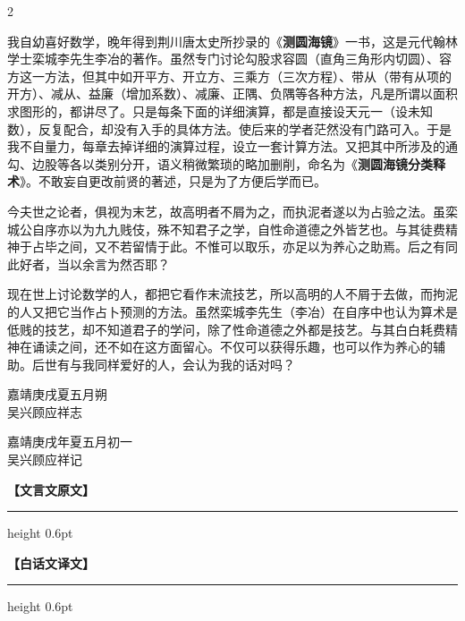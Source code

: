 \documentclass[11pt,a4paper]{article}
\newcommand{\colheaders}{%
  \noindent\begin{minipage}[t]{0.48\textwidth}\centering
    \textbf{\color{classicalframe}【文言文原文】}
    \vspace{0.3em}
    \hrule height 0.6pt
  \end{minipage}%
  \hfill
  \begin{minipage}[t]{0.48\textwidth}\centering
    \textbf{\color{modernframe}【白话文译文】}
    \vspace{0.3em}
    \hrule height 0.6pt
  \end{minipage}
  \par\medskip
}
\begin{document}
\begin{paracol}{2}
\switchcolumn

我自幼喜好数学，晚年得到荆川唐太史所抄录的《\textbf{测圆海镜}》一书，这是元代翰林学士栾城李先生李冶的著作。虽然专门讨论勾股求容圆（直角三角形内切圆）、容方这一方法，但其中如开平方、开立方、三乘方（三次方程）、带从（带有从项的开方）、减从、益廉（增加系数）、减廉、正隅、负隅等各种方法，凡是所谓以面积求图形的，都讲尽了。只是每条下面的详细演算，都是直接设天元一（设未知数），反复配合，却没有入手的具体方法。使后来的学者茫然没有门路可入。于是我不自量力，每章去掉详细的演算过程，设立一套计算方法。又把其中所涉及的通勾、边股等各以类别分开，语义稍微繁琐的略加删削，命名为《\textbf{测圆海镜分类释术}》。不敢妄自更改前贤的著述，只是为了方便后学而已。

\switchcolumn*

今夫世之论者，俱视为末艺，故高明者不屑为之，而执泥者遂以为占验之法。虽栾城公自序亦以为九九贱伎，殊不知君子之学，自性命道德之外皆艺也。与其徒费精神于占毕之间，又不若留情于此。不惟可以取乐，亦足以为养心之助焉。后之有同此好者，当以余言为然否耶？

\switchcolumn

现在世上讨论数学的人，都把它看作末流技艺，所以高明的人不屑于去做，而拘泥的人又把它当作占卜预测的方法。虽然栾城李先生（李冶）在自序中也认为算术是低贱的技艺，却不知道君子的学问，除了性命道德之外都是技艺。与其白白耗费精神在诵读之间，还不如在这方面留心。不仅可以获得乐趣，也可以作为养心的辅助。后世有与我同样爱好的人，会认为我的话对吗？

\switchcolumn*
\begin{flushright}
嘉靖庚戌夏五月朔\\
吴兴顾应祥志
\end{flushright}

\switchcolumn
\begin{flushright}
嘉靖庚戌年夏五月初一\\
吴兴顾应祥记
\end{flushright}

\switchcolumn*

\end{paracol}
\clearpage
\colheaders
\end{document}
